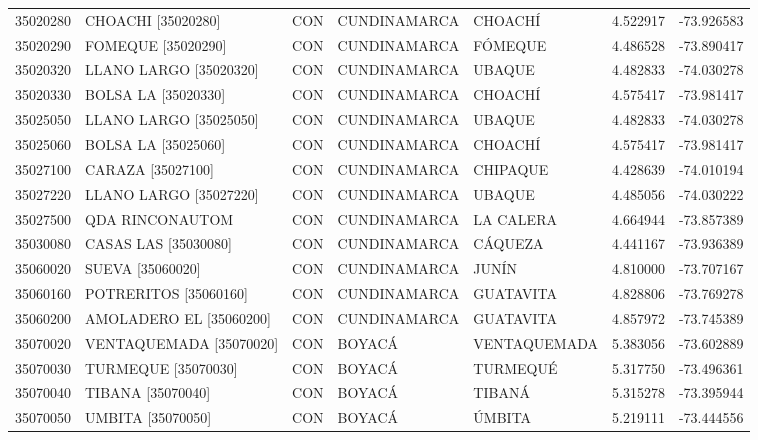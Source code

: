 \begin{longtable}{rllllrr}
 35020280 &          CHOACHI [35020280] &  CON &     CUNDINAMARCA &           CHOACHÍ &  4.522917 & -73.926583 \\
 35020290 &          FOMEQUE [35020290] &  CON &     CUNDINAMARCA &           FÓMEQUE &  4.486528 & -73.890417 \\
 35020320 &      LLANO LARGO [35020320] &  CON &     CUNDINAMARCA &            UBAQUE &  4.482833 & -74.030278 \\
 35020330 &         BOLSA LA [35020330] &  CON &     CUNDINAMARCA &           CHOACHÍ &  4.575417 & -73.981417 \\
 35025050 &      LLANO LARGO [35025050] &  CON &     CUNDINAMARCA &            UBAQUE &  4.482833 & -74.030278 \\
 35025060 &         BOLSA LA [35025060] &  CON &     CUNDINAMARCA &           CHOACHÍ &  4.575417 & -73.981417 \\
 35027100 &           CARAZA [35027100] &  CON &     CUNDINAMARCA &          CHIPAQUE &  4.428639 & -74.010194 \\
 35027220 &      LLANO LARGO [35027220] &  CON &     CUNDINAMARCA &            UBAQUE &  4.485056 & -74.030222 \\
 35027500 &             QDA RINCONAUTOM &  CON &     CUNDINAMARCA &         LA CALERA &  4.664944 & -73.857389 \\
 35030080 &        CASAS LAS [35030080] &  CON &     CUNDINAMARCA &           CÁQUEZA &  4.441167 & -73.936389 \\
 35060020 &            SUEVA [35060020] &  CON &     CUNDINAMARCA &             JUNÍN &  4.810000 & -73.707167 \\
 35060160 &       POTRERITOS [35060160] &  CON &     CUNDINAMARCA &         GUATAVITA &  4.828806 & -73.769278 \\
 35060200 &     AMOLADERO EL [35060200] &  CON &     CUNDINAMARCA &         GUATAVITA &  4.857972 & -73.745389 \\
 35070020 &  VENTAQUEMADA    [35070020] &  CON &           BOYACÁ &      VENTAQUEMADA &  5.383056 & -73.602889 \\
 35070030 &      TURMEQUE    [35070030] &  CON &           BOYACÁ &          TURMEQUÉ &  5.317750 & -73.496361 \\
 35070040 &           TIBANA [35070040] &  CON &           BOYACÁ &            TIBANÁ &  5.315278 & -73.395944 \\
 35070050 &           UMBITA [35070050] &  CON &           BOYACÁ &            ÚMBITA &  5.219111 & -73.444556 \\

\end{longtable}
